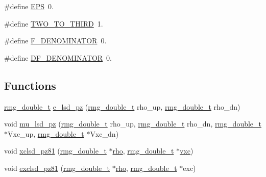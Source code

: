 \begin{DoxyCompactItemize}
\item 
\#define \hyperlink{_o_n_2_o_n-_n_e_g_f-share_2xclsd__pz81_8c_a6ebf6899d6c1c8b7b9d09be872c05aae}{E\-P\-S}~0.
\item 
\#define \hyperlink{_o_n_2_o_n-_n_e_g_f-share_2xclsd__pz81_8c_a2bbe95dffef79309c8740f48c3060c7c}{T\-W\-O\-\_\-\-T\-O\-\_\-\-T\-H\-I\-R\-D}~1.
\item 
\#define \hyperlink{_o_n_2_o_n-_n_e_g_f-share_2xclsd__pz81_8c_a2f4df01adbf5a5b8b05f8afff97db1b4}{F\-\_\-\-D\-E\-N\-O\-M\-I\-N\-A\-T\-O\-R}~0.
\item 
\#define \hyperlink{_o_n_2_o_n-_n_e_g_f-share_2xclsd__pz81_8c_a4cd590430265e7f061c979508fbb49fd}{D\-F\-\_\-\-D\-E\-N\-O\-M\-I\-N\-A\-T\-O\-R}~0.
\end{DoxyCompactItemize}
\subsection*{Functions}
\begin{DoxyCompactItemize}
\item 
\hyperlink{rmgtypes_8h_aaa16921c14f121c56eaa42390a340db8}{rmg\-\_\-double\-\_\-t} \hyperlink{_o_n_2_o_n-_n_e_g_f-share_2xclsd__pz81_8c_aefc4b0908f2d2f96eefb0772abc62d28}{e\-\_\-lsd\-\_\-pz} (\hyperlink{rmgtypes_8h_aaa16921c14f121c56eaa42390a340db8}{rmg\-\_\-double\-\_\-t} rho\-\_\-up, \hyperlink{rmgtypes_8h_aaa16921c14f121c56eaa42390a340db8}{rmg\-\_\-double\-\_\-t} rho\-\_\-dn)
\item 
void \hyperlink{_o_n_2_o_n-_n_e_g_f-share_2xclsd__pz81_8c_a9e83130eaeca181f8dce6ac3b62b5666}{mu\-\_\-lsd\-\_\-pz} (\hyperlink{rmgtypes_8h_aaa16921c14f121c56eaa42390a340db8}{rmg\-\_\-double\-\_\-t} rho\-\_\-up, \hyperlink{rmgtypes_8h_aaa16921c14f121c56eaa42390a340db8}{rmg\-\_\-double\-\_\-t} rho\-\_\-dn, \hyperlink{rmgtypes_8h_aaa16921c14f121c56eaa42390a340db8}{rmg\-\_\-double\-\_\-t} $\ast$Vxc\-\_\-up, \hyperlink{rmgtypes_8h_aaa16921c14f121c56eaa42390a340db8}{rmg\-\_\-double\-\_\-t} $\ast$Vxc\-\_\-dn)
\item 
void \hyperlink{_o_n_2_o_n-_n_e_g_f-share_2xclsd__pz81_8c_a3f1f761442e4db658d5e0203ffc923db}{xclsd\-\_\-pz81} (\hyperlink{rmgtypes_8h_aaa16921c14f121c56eaa42390a340db8}{rmg\-\_\-double\-\_\-t} $\ast$\hyperlink{md_8h_a52b35cee8a5db846ce98f4904e1c8b13}{rho}, \hyperlink{rmgtypes_8h_aaa16921c14f121c56eaa42390a340db8}{rmg\-\_\-double\-\_\-t} $\ast$\hyperlink{md_8h_a48f792faf570d41e1d58b4a4e1bce251}{vxc})
\item 
void \hyperlink{_o_n_2_o_n-_n_e_g_f-share_2xclsd__pz81_8c_a94ab30ea0f995bbcb3bf8f17beb347e8}{exclsd\-\_\-pz81} (\hyperlink{rmgtypes_8h_aaa16921c14f121c56eaa42390a340db8}{rmg\-\_\-double\-\_\-t} $\ast$\hyperlink{md_8h_a52b35cee8a5db846ce98f4904e1c8b13}{rho}, \hyperlink{rmgtypes_8h_aaa16921c14f121c56eaa42390a340db8}{rmg\-\_\-double\-\_\-t} $\ast$exc)
\end{DoxyCompactItemize}


